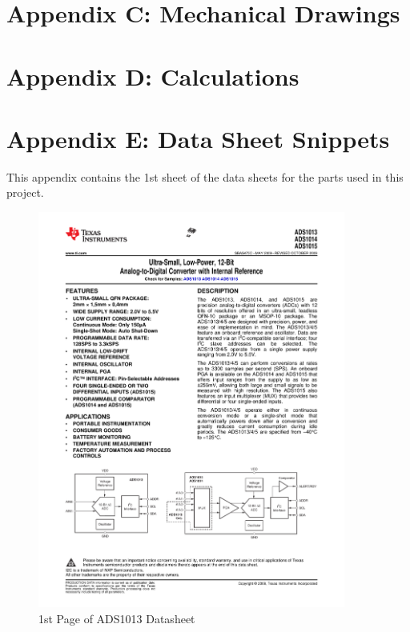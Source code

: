 \documentclass{article}
\begin{document}
{\begin{figure}[H]
	\caption{}
	\label{fig:bom2}
\end{figure}


\newpage
\section*{Appendix C: Mechanical Drawings}

\newpage
\section*{Appendix D: Calculations}

\newpage
\section*{Appendix E: Data Sheet Snippets}
This appendix contains the 1st sheet of the data sheets for the parts used in this project.
\begin{figure}[H]
	\centering
	\includegraphics[page=1,width=0.9\textwidth]{combined.pdf}
	\caption{1st Page of ADS1013 Datasheet}
	\label{fig:adsdat}
\end{figure}
\newpage
\begin{figure}[H]

\end{figure}}
\end{document}
